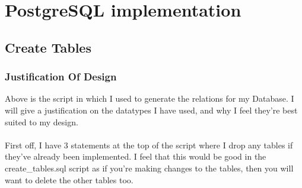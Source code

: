 \documentclass[12pt]{article}
\begin{document}
\section{PostgreSQL implementation}
\subsection{Create Tables}


\subsubsection{Justification Of Design}
Above is the script in which I used to generate the relations for my Database. I will give a justification on the datatypes I have used, and why I feel they're best suited to my design.
~\\\\
First off, I have 3 statements at the top of the script where I drop any tables if they've already been implemented. I feel that this would be good in the create\_tables.sql script as if you're making changes to the tables, then you will want to delete the other tables too. 
\end{document}

